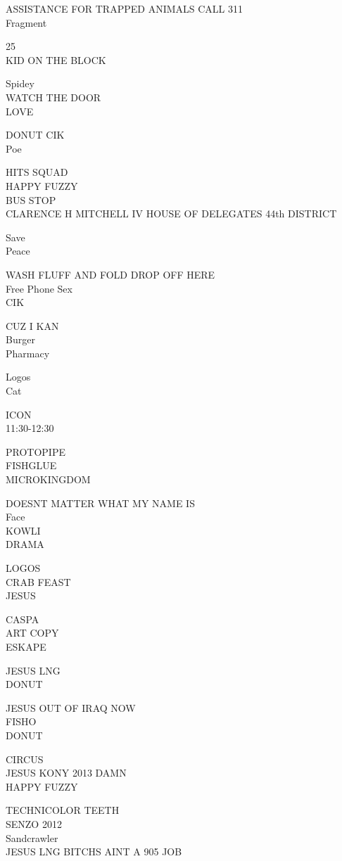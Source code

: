 \documentclass[10pt,letterpaper]{article}
\begin{document}
ASSISTANCE FOR TRAPPED ANIMALS CALL 311\\
Fragment

25\\
KID ON THE BLOCK

Spidey\\
WATCH THE DOOR\\
LOVE

DONUT CIK\\
Poe

HITS SQUAD\\
HAPPY FUZZY\\
BUS STOP\\
CLARENCE H MITCHELL IV HOUSE OF DELEGATES 44th DISTRICT

Save\\
Peace

WASH FLUFF AND FOLD DROP OFF HERE\\
Free Phone Sex\\
CIK

CUZ I KAN\\
Burger\\
Pharmacy

Logos\\
Cat

ICON\\
11:30{-}12:30

PROTOPIPE\\
FISHGLUE\\
MICROKINGDOM

DOESNT MATTER WHAT MY NAME IS\\
Face\\
KOWLI\\
DRAMA

LOGOS\\
CRAB FEAST\\
JESUS

CASPA\\
ART COPY\\
ESKAPE

JESUS LNG\\
DONUT

JESUS OUT OF IRAQ NOW\\
FISHO\\
DONUT

CIRCUS\\
JESUS KONY 2013 DAMN\\
HAPPY FUZZY

TECHNICOLOR TEETH\\
SENZO 2012\\
Sandcrawler\\
JESUS LNG BITCHS AINT A 905 JOB
\end{document}

